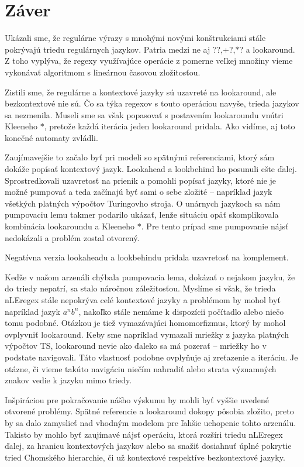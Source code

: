 \chapter*{Záver}\label{chap:conc}
{}

Ukázali sme, že regulárne výrazy s mnohými novými konštrukciami stále pokrývajú triedu regulárnych jazykov. Patria medzi ne aj {\ttfamily \selectfont ??,+?,$*$?} a lookaround. Z toho vyplýva, že regexy využívajúce operácie z pomerne veľkej množiny vieme vykonávať algoritmom s lineárnou časovou zložitosťou.

Zistili sme, že regulárne a kontextové jazyky sú uzavreté na lookaround, ale bezkontextové nie sú. Čo sa týka regexov s touto operáciou navyše, trieda jazykov sa nezmenila. Museli sme sa však popasovať s postavením lookaroundu vnútri Kleeneho $*$, pretože každá iterácia jeden lookaround pridala. Ako vidíme, aj toto konečné automaty zvládli.

Zaujímavejšie to začalo byť pri modeli so spätnými referenciami, ktorý sám dokáže popísať kontextový jazyk. Lookahead a lookbehind ho posunuli ešte ďalej. Sprostredkovali uzavretosť na prienik a pomohli popísať jazyky, ktoré nie je možné pumpovať a teda začínajú byť sami o sebe zložité -- napríklad jazyk všetkých platných výpočtov Turingovho stroja. O unárnych jazykoch sa nám pumpovaciu lemu takmer podarilo ukázať, lenže situáciu opäť skomplikovala kombinácia lookaroundu a Kleeneho $*$. Pre tento prípad sme pumpovanie nájsť nedokázali a problém zostal otvorený.

Negatívna verzia lookaheadu a lookbehindu pridala uzavretosť na komplement.

Keďže v našom arzenáli chýbala pumpovacia lema, dokázať o nejakom jazyku, že do triedy nepatrí, sa stalo náročnou záležitosťou. Myslíme si však, že trieda nLEregex stále nepokrýva celé kontextové jazyky a problémom by mohol byť napríklad jazyk $a^nb^n$, nakoľko stále nemáme k dispozícii počítadlo alebo niečo tomu podobné. Otázkou je tiež vymazávajúci homomorfizmus, ktorý by mohol ovplyvniť lookaround. Keby sme napríklad vymazali mriežky z jazyka platných výpočtov TS, lookaround nevie ako ďaleko sa má pozerať -- mriežky ho v podstate navigovali. Táto vlastnosť podobne ovplyňuje aj zreťazenie a iteráciu. Je otázne, či vieme takúto navigáciu niečím nahradiť alebo strata významných znakov vedie k jazyku mimo triedy.

Inšpiráciou pre pokračovanie nášho výskumu by mohli byť vyššie uvedené otvorené problémy. Spätné referencie a lookaround dokopy pôsobia zložito, preto by sa dalo zamyslieť nad vhodným modelom pre ľahšie uchopenie tohto arzenálu. Takisto by mohlo byť zaujímavé nájsť operáciu, ktorá rozšíri triedu nLEregex ďalej, za hranicu kontextových jazykov alebo sa snažiť dosiahnuť úplné pokrytie tried Chomského hierarchie, či už kontextové respektíve bezkontextové jazyky.
